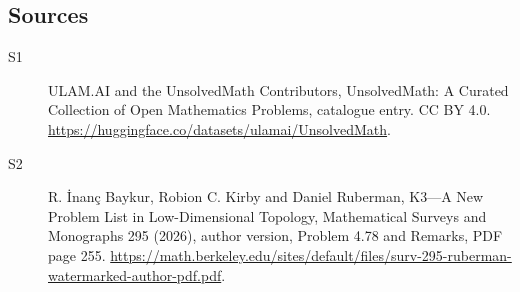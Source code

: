 \documentclass[11pt]{article}
\begin{document}
\subsection{Sources}
\begin{description}
\item[\hypertarget{source:statement:1}{S1}] ULAM.AI and the UnsolvedMath Contributors, UnsolvedMath: A Curated Collection of Open Mathematics Problems, catalogue entry. CC BY 4.0. \url{https://huggingface.co/datasets/ulamai/UnsolvedMath}.
\item[\hypertarget{source:statement:2}{S2}] R. İnanç Baykur, Robion C. Kirby and Daniel Ruberman, K3—A New Problem List in Low-Dimensional Topology, Mathematical Surveys and Monographs 295 (2026), author version, Problem 4.78 and Remarks, PDF page 255. \url{https://math.berkeley.edu/sites/default/files/surv-295-ruberman-watermarked-author-pdf.pdf}.
\end{description}
\label{end:statement}
\end{document}
